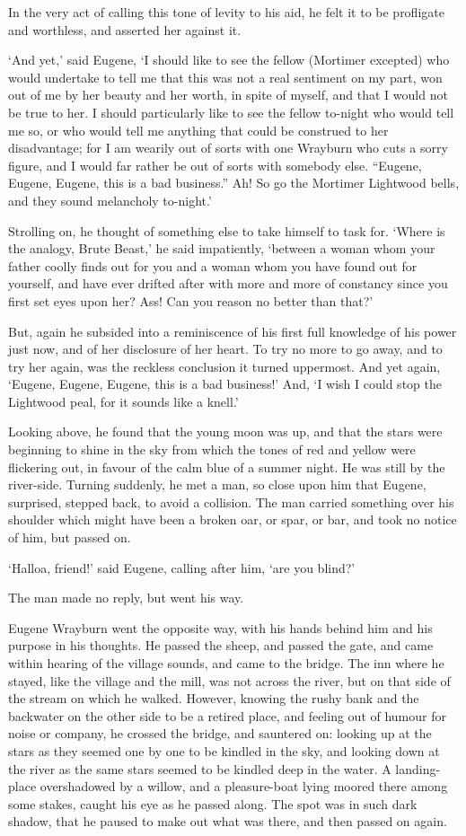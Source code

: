 In the very act of calling this tone of levity to his aid, he felt it to
be profligate and worthless, and asserted her against it.

‘And yet,’ said Eugene, ‘I should like to see the fellow (Mortimer
excepted) who would undertake to tell me that this was not a real
sentiment on my part, won out of me by her beauty and her worth,
in spite of myself, and that I would not be true to her. I should
particularly like to see the fellow to-night who would tell me so, or
who would tell me anything that could be construed to her disadvantage;
for I am wearily out of sorts with one Wrayburn who cuts a sorry figure,
and I would far rather be out of sorts with somebody else. “Eugene,
Eugene, Eugene, this is a bad business.” Ah! So go the Mortimer
Lightwood bells, and they sound melancholy to-night.’

Strolling on, he thought of something else to take himself to task for.
‘Where is the analogy, Brute Beast,’ he said impatiently, ‘between a
woman whom your father coolly finds out for you and a woman whom you
have found out for yourself, and have ever drifted after with more and
more of constancy since you first set eyes upon her? Ass! Can you reason
no better than that?’

But, again he subsided into a reminiscence of his first full knowledge
of his power just now, and of her disclosure of her heart. To try no
more to go away, and to try her again, was the reckless conclusion it
turned uppermost. And yet again, ‘Eugene, Eugene, Eugene, this is a bad
business!’ And, ‘I wish I could stop the Lightwood peal, for it sounds
like a knell.’

Looking above, he found that the young moon was up, and that the stars
were beginning to shine in the sky from which the tones of red and
yellow were flickering out, in favour of the calm blue of a summer
night. He was still by the river-side. Turning suddenly, he met a man,
so close upon him that Eugene, surprised, stepped back, to avoid a
collision. The man carried something over his shoulder which might
have been a broken oar, or spar, or bar, and took no notice of him, but
passed on.

‘Halloa, friend!’ said Eugene, calling after him, ‘are you blind?’

The man made no reply, but went his way.

Eugene Wrayburn went the opposite way, with his hands behind him and his
purpose in his thoughts. He passed the sheep, and passed the gate, and
came within hearing of the village sounds, and came to the bridge. The
inn where he stayed, like the village and the mill, was not across
the river, but on that side of the stream on which he walked. However,
knowing the rushy bank and the backwater on the other side to be a
retired place, and feeling out of humour for noise or company, he
crossed the bridge, and sauntered on: looking up at the stars as they
seemed one by one to be kindled in the sky, and looking down at the
river as the same stars seemed to be kindled deep in the water. A
landing-place overshadowed by a willow, and a pleasure-boat lying moored
there among some stakes, caught his eye as he passed along. The spot was
in such dark shadow, that he paused to make out what was there, and then
passed on again.

